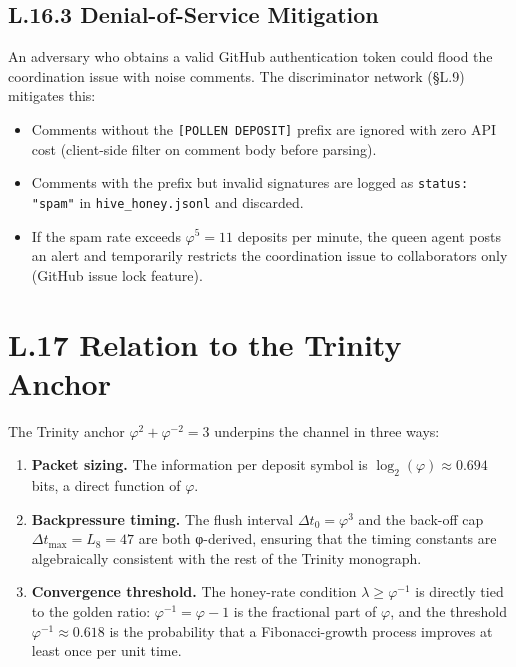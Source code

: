 \subsection*{L.16.3 \quad Denial-of-Service Mitigation}

An adversary who obtains a valid GitHub authentication token could
flood the coordination issue with noise comments.  The discriminator
network (§L.9) mitigates this:
\begin{itemize}
\item Comments without the \texttt{[POLLEN DEPOSIT]} prefix are
  ignored with zero API cost (client-side filter on comment body
  before parsing).
\item Comments with the prefix but invalid signatures are logged as
  \texttt{status: "spam"} in \texttt{hive\_honey.jsonl} and discarded.
\item If the spam rate exceeds $\varphi^{5} = 11$ deposits per minute,
  the queen agent posts an alert and temporarily restricts the
  coordination issue to collaborators only (GitHub issue lock
  feature).
\end{itemize}

\section*{L.17 \quad Relation to the Trinity Anchor}
\label{sec:appl-anchor}

The Trinity anchor $\varphi^{2} + \varphi^{-2} = 3$ underpins the
channel in three ways:

\begin{enumerate}
\item \textbf{Packet sizing.}  The information per deposit symbol is
  $\log_{2}(\varphi) \approx 0.694$ bits, a direct function of
  $\varphi$.

\item \textbf{Backpressure timing.}  The flush interval
  $\Delta t_{0} = \varphi^{3}$ and the back-off cap
  $\Delta t_{\max} = L_{8} = 47$ are both φ-derived, ensuring that
  the timing constants are algebraically consistent with the rest of
  the Trinity monograph.

\item \textbf{Convergence threshold.}  The honey-rate condition
  $\lambda \geq \varphi^{-1}$ is directly tied to the golden ratio:
  $\varphi^{-1} = \varphi - 1$ is the fractional part of $\varphi$,
  and the threshold $\varphi^{-1} \approx 0.618$ is the probability
  that a Fibonacci-growth process improves at least once per unit
  time.
\end{enumerate}

